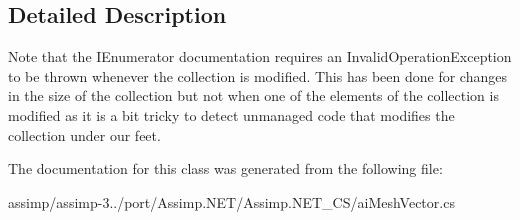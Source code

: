 \subsection{Detailed Description}
Note that the I\+Enumerator documentation requires an Invalid\+Operation\+Exception to be thrown whenever the collection is modified. This has been done for changes in the size of the collection but not when one of the elements of the collection is modified as it is a bit tricky to detect unmanaged code that modifies the collection under our feet. 

The documentation for this class was generated from the following file\+:\begin{DoxyCompactItemize}
\item 
assimp/assimp-\/3../port/\+Assimp.\+N\+E\+T/\+Assimp.\+N\+E\+T\+\_\+\+C\+S/ai\+Mesh\+Vector.\+cs\end{DoxyCompactItemize}
